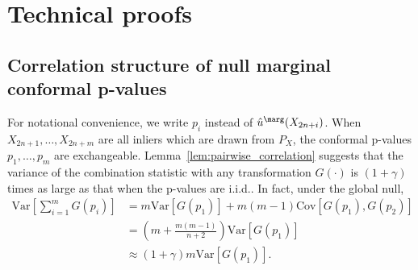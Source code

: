 \section{Technical proofs} \label{app:proofs}


\subsection{Correlation structure of null marginal conformal p-values} \label{app:correlation-structure}

For notational convenience, we write $p_i$ instead of $\hat{u}^\marg(X_{2n+i})$. When $X_{2n+1}, \ldots, X_{2n+m}$ are all inliers which are drawn from $P_{X}$, the conformal p-values $p_1, \ldots, p_m$ are exchangeable.
Lemma~\ref{lem:pairwise_correlation} suggests that the variance of the combination statistic with any transformation $G(\cdot)$ is $(1 + \gamma)$ times as large as that when the p-values are i.i.d.. In fact, under the global null,
\begin{align*}
\mathrm{Var}\left[\sum_{i=1}^{m}G(p_i)\right]& = m\mathrm{Var}\left[ G(p_1)\right] + m(m-1)\mathrm{Cov}\left[ G(p_1), G(p_2) \right]\\
& = \left(m + \frac{m(m-1)}{n+2}\right)\mathrm{Var}\left[G(p_1)\right]\\
& \approx (1 + \gamma)m\mathrm{Var}\left[G(p_1)\right].
\end{align*}

